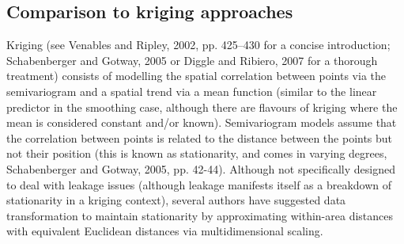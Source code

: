 \documentclass[useAMS, referee]{biom}
\begin{document}
\subsection{Comparison to kriging approaches}

Kriging  (see Venables and Ripley, 2002, pp. 425--430 for a concise introduction; Schabenberger and Gotway, 2005 or Diggle and Ribiero, 2007 for a thorough treatment) consists of modelling the spatial correlation between points via the semivariogram and a spatial trend via a mean function (similar to the linear predictor in the smoothing case, although there are flavours of kriging where the mean is considered constant and/or known). Semivariogram models assume that the correlation between points is related to the distance between the points but not their position (this is known as stationarity, and comes in varying degrees, Schabenberger and Gotway, 2005, pp. 42-44). Although not specifically designed to deal with leakage issues (although leakage manifests itself as a breakdown of stationarity in a kriging context), several authors have suggested data transformation to maintain stationarity by approximating within-area distances with equivalent Euclidean distances via multidimensional scaling.

\end{document}
